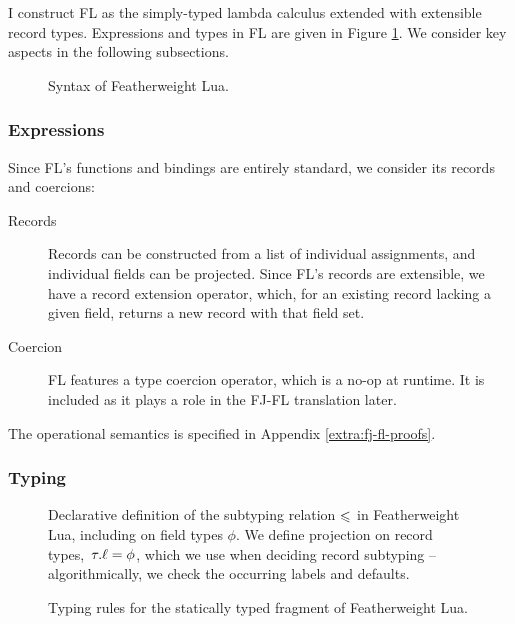 I construct FL as the simply-typed lambda calculus extended with extensible record types. Expressions and types in FL are given in Figure \ref{fig:featherweight-lua-grammar}. We consider key aspects in the following subsections.

\begin{figure}
    \centering
    
    \caption{Syntax of Featherweight Lua.}
    \label{fig:featherweight-lua-grammar}
\end{figure}

\subsubsection{Expressions}

Since FL's functions and bindings are entirely standard, we consider its records and coercions:
\begin{description}
    \item[Records] Records can be constructed from a list of individual assignments, and individual fields can be projected. Since FL's records are extensible, we have a record extension operator, which, for an existing record lacking a given field, returns a new record with that field set.
    \item[Coercion] FL features a type coercion operator, which is a no-op at runtime. It is included as it plays a role in the FJ-FL translation later.
\end{description}
The operational semantics is specified in Appendix \ref{extra:fj-fl-proofs}.

\subsubsection{Typing}

\begin{figure}
    \centering
    
    \caption{Declarative definition of the subtyping relation $\leqslant$ in Featherweight Lua, including on field types $\phi$. We define projection on record types,~${\tau}{.}{\ell} = \phi$, which we use when deciding record subtyping -- algorithmically, we check the occurring labels and defaults.}
    \label{fig:featherweight-lua-subtyping}
\end{figure}

\begin{figure}
    
    \caption{Typing rules for the statically typed fragment of Featherweight Lua.}
    \label{fig:featherweight-lua-typing}
\end{figure}

